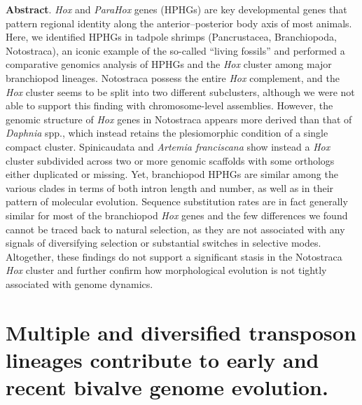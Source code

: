 \documentclass[../main.tex]{subfiles}
\begin{document}
\textbf{Abstract}. \textit{Hox} and \textit{ParaHox} genes (HPHGs) are key developmental genes that pattern regional identity along the anterior–posterior body axis of most animals. Here, we identified HPHGs in tadpole shrimps (Pancrustacea, Branchiopoda, Notostraca), an iconic example of the so-called “living fossils” and performed a comparative genomics analysis of HPHGs and the \textit{Hox} cluster among major branchiopod lineages. Notostraca possess the entire \textit{Hox} complement, and the \textit{Hox} cluster seems to be split into two different subclusters, although we were not able to support this finding with chromosome-level assemblies. However, the genomic structure of \textit{Hox} genes in Notostraca appears more derived than that of \textit{Daphnia} spp., which instead retains the plesiomorphic condition of a single compact cluster. Spinicaudata and \textit{Artemia franciscana} show instead a \textit{Hox} cluster subdivided across two or more genomic scaffolds with some orthologs either duplicated or missing. Yet, branchiopod HPHGs are similar among the various clades in terms of both intron length and number, as well as in their pattern of molecular evolution. Sequence substitution rates are in fact generally similar for most of the branchiopod \textit{Hox} genes and the few differences we found cannot be traced back to natural selection, as they are not associated with any signals of diversifying selection or substantial switches in selective modes. Altogether, these findings do not support a significant stasis in the Notostraca \textit{Hox} cluster and further confirm how morphological evolution is not tightly associated with genome dynamics.


{
\section*{\LARGE{Multiple and diversified transposon lineages contribute to early and recent bivalve genome evolution.}}

\vspace{5mm}


\vspace{5mm}



\vspace{5mm}

}
\end{document}
